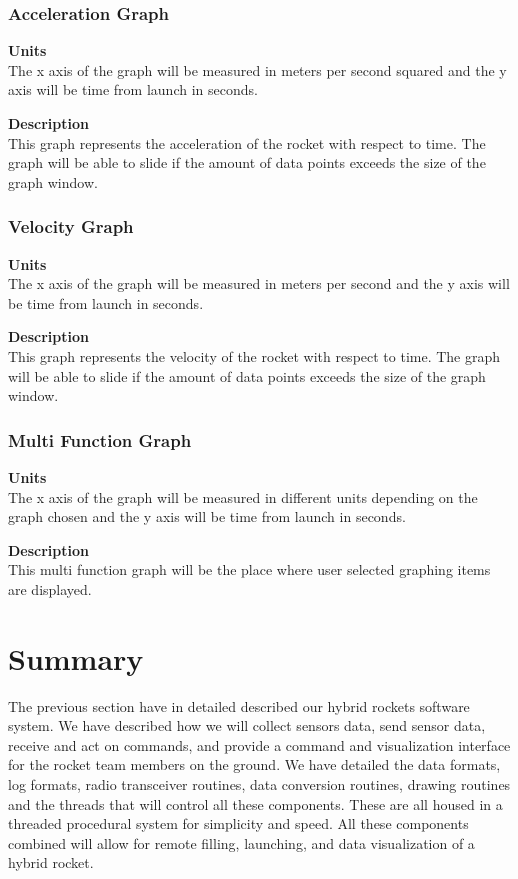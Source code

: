 \documentclass[10pt,draftclsnofoot,onecolumn,compsoc]{IEEEtran}
\begin{document}
\subsubsection{Acceleration Graph}
{\bf Units} \\ The x axis of the graph will be measured in meters per second squared and the y axis will be time from launch in seconds.\par
{\bf Description} \\ This graph represents the acceleration of the rocket with respect to time. The graph will be able to slide if the amount of data points exceeds the size of the graph window. \par

\subsubsection{Velocity Graph}
{\bf Units} \\ The x axis of the graph will be measured in meters per second and the y axis will be time from launch in seconds.\par
{\bf Description} \\ This graph represents the velocity of the rocket with respect to time. The graph will be able to slide if the amount of data points exceeds the size of the graph window. \par

\subsubsection{Multi Function Graph}
{\bf Units} \\ The x axis of the graph will be measured in different units depending on the graph chosen and the y axis will be time from launch in seconds.\par
{\bf Description} \\ This multi function graph will be the place where user selected graphing items are displayed. \par

\section{Summary}
The previous section have in detailed described our hybrid rockets software system. We have described how we will collect sensors data, send sensor data, receive and act on commands, and provide  a command and visualization interface for the rocket team members on the ground. We have detailed the data formats, log formats, radio transceiver routines, data conversion routines, drawing routines and the threads that will control all these components. These are all housed in a threaded procedural system for simplicity and speed. All these components combined will allow for remote filling, launching, and data visualization of a hybrid rocket. \par
\end{document}
